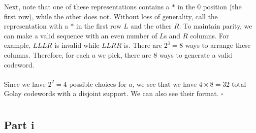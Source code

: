\documentclass[letterpaper]{article}
\newcommand*{\QED}{\hfill\ensuremath{\square}}%
\begin{document}
Next, note that one of these representations contains a $ * $ in the $ 0 $ position (the first row), while the other does not.
Without loss of generality, call the representation with a $ * $ in the first row $ L $ and the other $ R $.
To maintain parity, we can make a valid sequence with an even number of $ L $s and $ R $ columns.
For example, $ LLLR $ is invalid while $ LLRR $ is.
There are $ 2^3 = 8 $ ways to arrange these columns.
Therefore, for each $ a $ we pick, there are $ 8 $ ways to generate a valid codeword.
\\ \\
Since we have $ 2^2 = 4 $ possible choices for $ a $, we see that we have $ 4 \times 8 = 32 $ total Golay codewords with a disjoint support.
We can also see their format.
\QED{}

\section{}
\label{sec:Question7}

\subsection{Part i}
\label{subs:7Parti}
\end{document}
